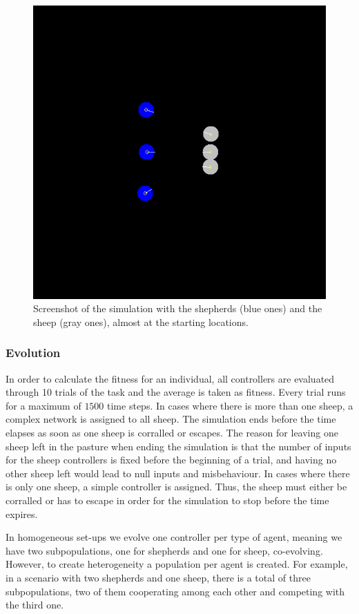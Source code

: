 \documentclass[conference]{IEEEtran}
\begin{document}
\begin{figure}[t]
	\centering
	\includegraphics[width=0.8\hsize]{imgs/pasture.png}
	\caption{Screenshot of the simulation with the shepherds (blue ones) and the sheep (gray ones), almost at the starting locations.}
	\label{fig:simulation_screenshot}
\end{figure}


\subsubsection{Evolution}
In order to calculate the fitness for an individual, all controllers are evaluated through 10 trials of the task and the average is taken as fitness.
Every trial runs for a maximum of $1500$ time steps. 
In cases where there is more than one sheep, a complex network is assigned to all sheep. 
The simulation ends before the time elapses as soon as one sheep is corralled or escapes. 
The reason for leaving one sheep left in the pasture when ending the simulation is that the number of inputs for the sheep controllers is fixed before the beginning of a trial, and having no other sheep left would lead to null inputs and misbehaviour. 
In cases where there is only one sheep, a simple controller is assigned. 
Thus, the sheep must either be corralled or has to escape in order for the simulation to stop before the time expires.

In homogeneous set-ups we evolve one controller per type of agent, meaning we have two subpopulations, one for shepherds and one for sheep, co-evolving. 
However, to create heterogeneity a population per agent is created. 
For example, in a scenario with two shepherds and one sheep, there is a total of three subpopulations, two of them cooperating among each other and competing with the third one.  
\end{document}

